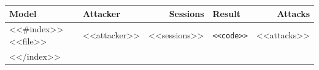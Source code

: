 \begin{center}
\label{tab:summary}
\begin{tabular}{@{}llrlr@{}}
\toprule
Model & Attacker & Sessions & Result & Attacks \\
\midrule
<<#index>><<file>> & <<attacker>> & <<sessions>> & \texttt{<<code>>} & <<attacks>> \\
<</index>>\bottomrule
\end{tabular}
\end{center}
